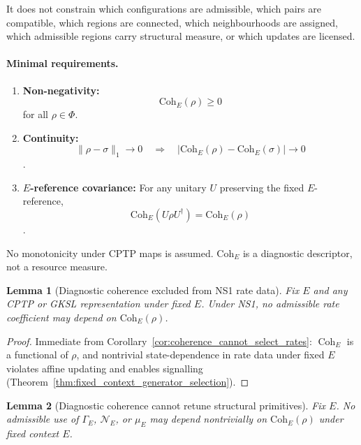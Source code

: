 \documentclass[aps,prx,onecolumn,11pt]{revtex4-2}
\theoremstyle{plain}
\newtheorem{lemma}{Lemma}
\theoremstyle{definition}
\theoremstyle{remark}
\newcommand{\Coh}{\operatorname{Coh}}       %
\begin{document}
It does not constrain which configurations are admissible, which pairs
are compatible, which regions are connected, which neighbourhoods are
assigned, which admissible regions carry structural measure, or which
updates are licensed.

\paragraph{Minimal requirements.}

\begin{enumerate}[label=(\roman*)]

\item \textbf{Non-negativity:}
\[
\mathrm{Coh}_E(\rho)\ge 0
\]
for all \(\rho\in\Phi\).

\item \textbf{Continuity:}
\[
\|\rho-\sigma\|_1\to 0
\quad\Longrightarrow\quad
|\mathrm{Coh}_E(\rho)-\mathrm{Coh}_E(\sigma)|\to 0
\]
\cite{Watrous2018,Wilde2017}.

\item \textbf{\(E\)-reference covariance:}
For any unitary \(U\) preserving the fixed \(E\)-reference,
\[
\mathrm{Coh}_E(U\rho U^\dagger)
=
\mathrm{Coh}_E(\rho)
\]
\cite{MarvianSpekkens2016,ChitambarGour2019}.

\end{enumerate}

No monotonicity under CPTP maps is assumed. \(\mathrm{Coh}_E\) is a
diagnostic descriptor, not a resource measure.

\begin{lemma}[Diagnostic coherence excluded from NS1 rate data]
\label{lem:coh_no_rate_role}
Fix \(E\) and any CPTP or GKSL representation under fixed \(E\). Under
NS1, no admissible rate coefficient may depend on
\(\mathrm{Coh}_E(\rho)\).
\end{lemma}

\begin{proof}
Immediate from
Corollary~\ref{cor:coherence_cannot_select_rates}: \(\Coh_E\) is a
functional of \(\rho\), and nontrivial state-dependence in rate data
under fixed \(E\) violates affine updating and enables signalling
(Theorem~\ref{thm:fixed_context_generator_selection}).
\end{proof}

\begin{lemma}[Diagnostic coherence cannot retune structural primitives]
\label{lem:coh_no_structural_retuning}
Fix \(E\). No admissible use of \(\Gamma_E\), \(\mathcal N_E\), or
\(\mu_E\) may depend nontrivially on \(\mathrm{Coh}_E(\rho)\) under
fixed context \(E\).
\end{lemma}
\end{document}
